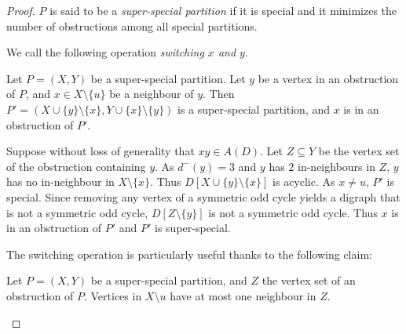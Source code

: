 \begin{proof}
    $P$ is said to be a \emph{super-special partition} if it is special and it minimizes the number of obstructions among all special partitions. 
    
    We call the following operation \emph{switching $x$ and $y$}.
    
    \begin{claim}\label{clm:switch}
        Let $P = (X,Y)$ be a super-special partition. Let $y$ be a vertex in an obstruction of $P$, and $x \in X \setminus \{u\}$ be a neighbour of $y$. Then $P' = (X \cup \{y\} \setminus \{x\}, Y \cup \{x\} \setminus \{y\})$ is a super-special partition, and $x$ is in an obstruction of $P'$.
    \end{claim}
    
    \begin{proofclaim}
         Suppose without loss of generality that $xy \in A(D)$. Let $Z \subseteq Y$ be the vertex set of the obstruction containing $y$. As $d^-(y) = 3$ and $y$ has $2$ in-neighbours in $Z$, $y$ has no in-neighbour in $X \setminus \{x\}$. Thus $D[X \cup \{y\} \setminus \{x\}]$ is acyclic. As $x \neq u$,  $P'$ is special. 
         Since removing any vertex of a symmetric odd cycle yields a digraph that is not a symmetric odd cycle, $D[Z \setminus \{y\}]$ is not a symmetric odd cycle. Thus $x$ is in an obstruction of $P'$ and $P'$ is super-special. 
    \end{proofclaim}

    The switching operation is particularly useful thanks to the following claim:

    \begin{claim}\label{clm:two_neighbours_obstruction}
     Let $P = (X,Y)$ be a super-special partition, and $Z$ the vertex set of an obstruction of $P$. Vertices in $X \setminus u$ have at most one neighbour in $Z$. 
    \end{claim}


\end{proof}
